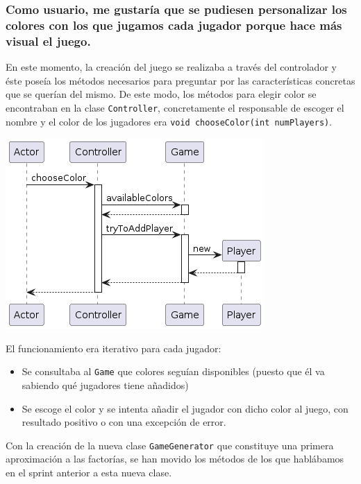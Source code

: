 \documentclass[../DocumentoOficial.tex]{subfiles}
\begin{document}
\subsubsection{Como usuario, me gustaría que se pudiesen personalizar los colores con los que jugamos cada jugador porque hace más visual el juego.}
\begin{sprint}[2]
En este momento, la creación del juego se realizaba a través del controlador y éste poseía los métodos necesarios para preguntar por las características concretas que se querían del mismo. De este modo, los métodos para elegir color se encontraban en la clase \texttt{Controller}, concretamente el responsable de escoger el nombre y el color de los jugadores era \texttt{void chooseColor(int numPlayers)}.

\begin{center}
\includegraphics[scale=0.5]{ChooseColor_sprint2_seq}
\end{center}

El funcionamiento era iterativo para cada jugador:
\begin{itemize}
\item Se consultaba al \texttt{Game} que colores seguían disponibles (puesto que él va sabiendo qué jugadores tiene añadidos)
\item Se escoge el color y se intenta añadir el jugador con dicho color al juego, con resultado positivo o con una excepción de error.
\end{itemize}
\end{sprint}

\begin{sprint}[3]
Con la creación de la nueva clase \texttt{GameGenerator} que constituye una primera aproximación a las factorías, se han movido los métodos de los que hablábamos en el sprint anterior a esta nueva clase.
\end{sprint}
\end{document}
